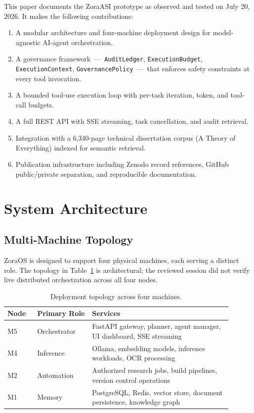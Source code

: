 \documentclass[11pt]{article}
\begin{document}
This paper documents the ZoraASI prototype as observed and tested on July 20, 2026. It makes the following contributions:

\begin{enumerate}[leftmargin=*]
  \item A modular architecture and four-machine deployment design for model-agnostic AI-agent orchestration.
  \item A governance framework\ ---\ \texttt{AuditLedger}, \texttt{ExecutionBudget}, \texttt{ExecutionContext}, \texttt{GovernancePolicy}\ ---\ that enforces safety constraints at every tool invocation.
  \item A bounded tool-use execution loop with per-task iteration, token, and tool-call budgets.
  \item A full REST API with SSE streaming, task cancellation, and audit retrieval.
  \item Integration with a 6,340-page technical dissertation corpus (A Theory of Everything) indexed for semantic retrieval.
  \item Publication infrastructure including Zenodo record references, GitHub public/private separation, and reproducible documentation.
\end{enumerate}

\section{System Architecture}

\subsection{Multi-Machine Topology}

ZoraOS is designed to support four physical machines, each serving a distinct role. The
topology in Table~\ref{tab:topology} is architectural; the reviewed session did not
verify live distributed orchestration across all four nodes.

\begin{table}[ht]
\centering
\caption{Deployment topology across four machines.}
\label{tab:topology}
\begin{tabular}{p{0.12\linewidth} p{0.22\linewidth} p{0.56\linewidth}}
\toprule
\textbf{Node} & \textbf{Primary Role} & \textbf{Services} \\
\midrule
M5 & Orchestrator & FastAPI gateway, planner, agent manager, UI dashboard, SSE streaming \\
M4 & Inference & Ollama, embedding models, inference workloads, OCR processing \\
M2 & Automation & Authorized research jobs, build pipelines, version control operations \\
M1 & Memory & PostgreSQL, Redis, vector store, document persistence, knowledge graph \\
\bottomrule
\end{tabular}
\end{table}
\end{document}
